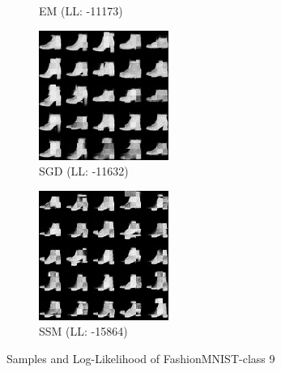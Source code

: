 \begin{figure}[H]
\begin{subfigure}[b]{0.24\textwidth}
        \caption{EM (LL: -11173)}
    \end{subfigure}
    \begin{subfigure}[b]{0.24\textwidth}
        \centering
        \includegraphics[width=\textwidth]{figures/einsum/9fashion-mnist_SGD.png} 
        \caption{SGD (LL: -11632)}
    \end{subfigure}
    \begin{subfigure}[b]{0.24\textwidth}
        \centering
        \includegraphics[width=\textwidth]{figures/einsum/9fashion-mnist_SSM.png}
        \caption{SSM (LL: -15864)}
    \end{subfigure}
    \caption{Samples and Log-Likelihood of FashionMNIST-class 9}
\end{figure}

